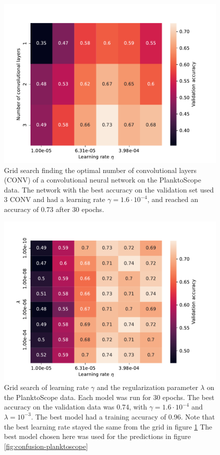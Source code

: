 \begin{figure}
    \centering
    \includegraphics[width=\linewidth]{examples/tests_even/figs/gridsearch-nconv-128-2024-12-12_1108.pdf}
    \caption{Grid search finding the optimal number of convolutional layers (CONV) of a convolutional neural network on the PlanktoScope data. The network with the best accuracy on the validation set used 3 CONV and had a learning rate $\gamma = 1.6 \cdot 10^{-4}$, and reached an accuracy of 0.73 after 30 epochs.}
    \label{fig:gridsearch-nconv}
\end{figure}

\begin{figure}
    \centering
    \includegraphics[width=\linewidth]{examples/tests_even/figs/gridsearch-128-2024-12-06_1241.pdf}
    \caption{Grid search of learning rate $\gamma$ and the regularization parameter $\lambda$ on the PlanktoScope data. Each model was run for 30 epochs. The best accuracy on the validation data was 0.74, with $\gamma = 1.6 \cdot 10^{-4}$ and $\lambda=10^{-3}$. The best model had a training accuracy of 0.96. Note that the best learning rate stayed the same from the grid in figure \ref{fig:gridsearch-nconv} The best model chosen here was used for the predictions in figure \ref{fig:confusion-planktoscope}}
    \label{fig:gridsearch-planktoscope}
\end{figure}


